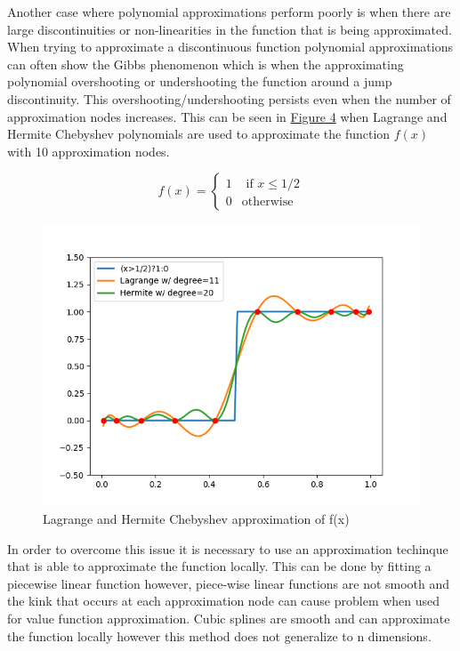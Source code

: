 \documentclass[12pt]{article}
\begin{document}
Another case where polynomial approximations perform poorly is when there are large discontinuities or non-linearities in the function that is being approximated. When trying to approximate a discontinuous function polynomial approximations can often show the Gibbs phenomenon which is when the approximating polynomial overshooting or undershooting the function around a jump discontinuity. This overshooting/undershooting persists even when the number of approximation nodes increases. This can be seen in \hyperref[ref_Cheb_Ind_Func]{Figure 4} when Lagrange and Hermite Chebyshev polynomials are used to approximate the function $f(x)$ with 10 approximation nodes.

\begin{equation}
  \label{ind_func}
  f(x)=\begin{cases}
    1 & \text{ if } x\leq1/2\\
    0 & \text{otherwise}
  \end{cases}
\end{equation}

\begin{figure}[H]
  \label{ref_Cheb_Ind_Func}
  \centering
  \includegraphics[scale=.8]{plot_Cheb_Ind_Func}
  \caption{Lagrange and Hermite Chebyshev approximation of f(x)}
\end{figure}

In order to overcome this issue it is necessary to use an approximation techinque that is able to approximate the function locally. This can be done by fitting a piecewise linear function however, piece-wise linear functions are not smooth and the kink that occurs at each approximation node can cause problem when used for value function approximation. Cubic splines are smooth and can approximate the function locally however this method does not generalize to n dimensions.
\end{document}
